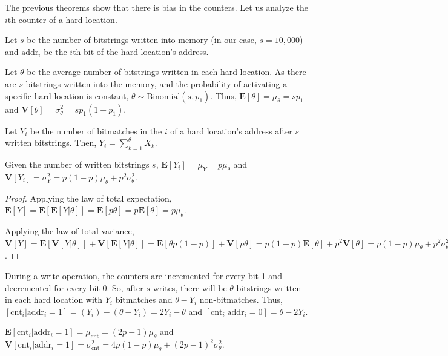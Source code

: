 The previous theorems show that there is bias in the counters. Let us analyze the $i$th counter of a hard location.

Let $s$ be the number of bitstrings written into memory (in our case, $s=10,000$) and $\text{addr}_i$ be the $i$th bit of the hard location's address.

Let $\theta$ be the average number of bitstrings written in each hard location. As there are $s$ bitstrings written into the memory, and the probability of activating a specific hard location is constant, $\theta \sim \text{Binomial}(s, p_1)$. Thus, $\mathbf{E}[\theta] = \mu_\theta = s p_1$ and $\mathbf{V}[\theta] = \sigma^2_\theta = s p_1 (1 - p_1)$.

Let $Y_i$ be the number of bitmatches in the $i$ of a hard location's address after $s$ written bitstrings. Then, $Y_i = \sum_{k=1}^{\theta} X_k$.

\begin{theorem}
Given the number of written bitstrings $s$, $\mathbf{E}[Y_i] = \mu_Y = p \mu_\theta$ and $\mathbf{V}[Y_i] = \sigma^2_Y = p(1-p) \mu_\theta + p^2 \sigma^2_\theta$.
\end{theorem}
\begin{proof}
Applying the law of total expectation, $\mathbf{E}[Y] = \mathbf{E}[\mathbf{E}[Y|\theta]] = \mathbf{E}[p \theta] = p \mathbf{E}[\theta] = p \mu_\theta$.

Applying the law of total variance, $\mathbf{V}[Y] = \mathbf{E}[\mathbf{V}[Y|\theta]] + \mathbf{V}[\mathbf{E}[Y|\theta]] = \mathbf{E}[\theta p (1-p)] + \mathbf{V}[p \theta] = p(1-p) \mathbf{E}[\theta] + p^2 \mathbf{V}[\theta] = p(1-p) \mu_\theta + p^2 \sigma^2_\theta$.
\end{proof}

During a write operation, the counters are incremented for every bit 1 and decremented for every bit 0. So, after $s$ writes, there will be $\theta$ bitstrings written in each hard location with $Y_i$ bitmatches and $\theta - Y_i$ non-bitmatches. Thus, $[\text{cnt}_i | \text{addr}_i = 1] = (Y_i) - (\theta - Y_i) = 2Y_i - \theta$ and $[\text{cnt}_i | \text{addr}_i = 0] = \theta - 2Y_i$.

\begin{theorem}
$\mathbf{E}[\text{cnt}_i | \text{addr}_i = 1] = \mu_{\text{cnt}} = (2p-1) \mu_\theta$ and $\mathbf{V}[\text{cnt}_i | \text{addr}_i = 1] = \sigma^2_\text{cnt} = 4p(1-p) \mu_\theta + (2p-1)^2 \sigma^2_\theta$.
\end{theorem}

